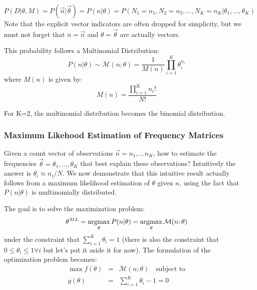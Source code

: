 \begin{equation}
P(D|\theta,M) = P(\vec{n}|\vec{\theta}) = P(n|\theta) = 
P(N_1 = n_1, N_2 = n_2, ... , N_K = n_K | \theta_1, ... , \theta_K)
\end{equation}
Note that the explicit vector indicators are often dropped for simplicity, but we must not forget that $n=\vec{n}$ and $\theta=\vec{\theta}$ are actually vectors.

This probability follows a Multinomial Distribution:
\begin{equation}
P(n|\theta) \sim \mathcal{M}(n;\theta) =
\frac{1}{M(n)} \prod_{i=1}^K \theta_i ^ {n_i}
\end{equation}
where $M(n)$ is given by:
\begin{equation}
M(n) = \frac{\prod_{i=1}^K n_i !}{N !}
\end{equation}

For K=2, the multinomial distribution becomes the binomial distribution.



\subsubsection{Maximum Likehood Estimation of Frequency Matrices}
\label{sec:mlintuitive}

Given a count vector of observations $\vec{n} = n_1, ... n_K$, how to estimate the frequencies $\vec{\theta} = \theta_1, ... , \theta_K$ that best explain these observations? Intuitively the answer is $\theta_i \approx n_i / N$. We now demonstrate that this intuitive result actually follows from a maximum likelihood estimation of $\theta$ given $n$, using the fact that $P(n|\theta)$ is multinomially distributed.

The goal is to solve the maximization problem:
\begin{equation}
\theta^{ML} = \argmax_\theta P(n|\theta) = \argmax_\theta \mathcal{M}(n;\theta)
\end{equation}
under the constraint that $\sum_{i=1}^K \theta_i = 1$ (there is also the constraint that $0 \le \theta_i \le 1 \forall i$ but let's put it aside it for now). The formulation of the optimization problem becomes:
%
\begin{eqnarray}
\max f(\theta) & = & \mathcal{M}(n;\theta)  \quad \text{subject to} \\
g(\theta) & = & \sum_{i=1}^K \theta_i - 1 = 0
\label{eq:multinomial:constr}
\end{eqnarray}

